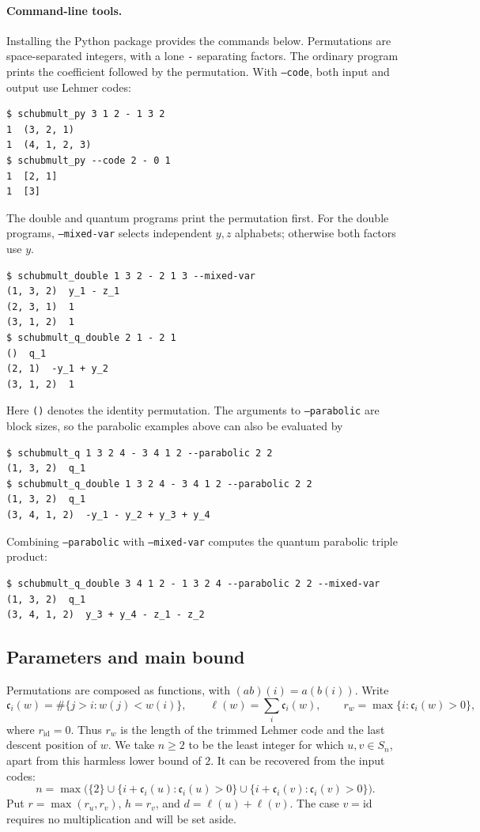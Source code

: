 \documentclass{amsart}
\theoremstyle{definition}
\theoremstyle{remark}
\numberwithin{equation}{section}
\newcommand{\code}{\mathfrak c}
\newcommand{\id}{\mathrm{id}}
\begin{document}
\paragraph{Command-line tools.}
Installing the Python package provides the commands below.
Permutations are space-separated integers, with a lone \texttt{-}
separating factors. The ordinary program prints the coefficient
followed by the permutation. With \texttt{--code}, both input and
output use Lehmer codes:
\begin{verbatim}
$ schubmult_py 3 1 2 - 1 3 2
1  (3, 2, 1)
1  (4, 1, 2, 3)
$ schubmult_py --code 2 - 0 1
1  [2, 1]
1  [3]
\end{verbatim}
The double and quantum programs print the permutation first.
For the double programs, \texttt{--mixed-var} selects independent
$y,z$ alphabets; otherwise both factors use $y$.
\begin{verbatim}
$ schubmult_double 1 3 2 - 2 1 3 --mixed-var
(1, 3, 2)  y_1 - z_1
(2, 3, 1)  1
(3, 1, 2)  1
$ schubmult_q_double 2 1 - 2 1
()  q_1
(2, 1)  -y_1 + y_2
(3, 1, 2)  1
\end{verbatim}
Here \texttt{()} denotes the identity permutation. The arguments to
\texttt{--parabolic} are block sizes, so the parabolic examples above
can also be evaluated by
\begin{verbatim}
$ schubmult_q 1 3 2 4 - 3 4 1 2 --parabolic 2 2
(1, 3, 2)  q_1
$ schubmult_q_double 1 3 2 4 - 3 4 1 2 --parabolic 2 2
(1, 3, 2)  q_1
(3, 4, 1, 2)  -y_1 - y_2 + y_3 + y_4
\end{verbatim}
Combining \texttt{--parabolic} with \texttt{--mixed-var} computes
the quantum parabolic triple product:
\begin{verbatim}
$ schubmult_q_double 3 4 1 2 - 1 3 2 4 --parabolic 2 2 --mixed-var
(1, 3, 2)  q_1
(3, 4, 1, 2)  y_3 + y_4 - z_1 - z_2
\end{verbatim}

\subsection{Parameters and main bound}

Permutations are composed as functions, with $(ab)(i)=a(b(i))$.
Write
\[
 \code_i(w)=\#\{j>i:w(j)<w(i)\},\qquad
 \ell(w)=\sum_i\code_i(w),\qquad
 r_w=\max\{i:\code_i(w)>0\},
\]
where $r_{\id}=0$. Thus $r_w$ is the length of the trimmed Lehmer code
and the last descent position of $w$.
We take $n\geq2$ to be the least integer for which $u,v\in S_n$,
apart from this harmless lower bound of $2$.
It can be recovered from the input codes:
\[
 n=\max\bigl(\{2\}\cup\{i+\code_i(u):\code_i(u)>0\}
                     \cup\{i+\code_i(v):\code_i(v)>0\}\bigr).
\]
Put $r=\max(r_u,r_v)$, $h=r_v$, and $d=\ell(u)+\ell(v)$.
The case $v=\id$ requires no multiplication and will be set aside.
\end{document}

